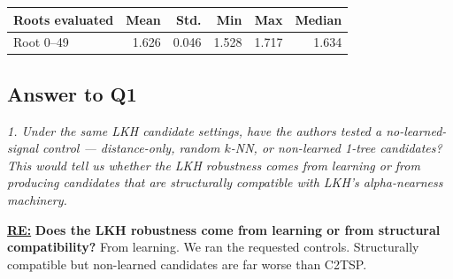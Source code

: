 \begin{table}[htbp]
    \centering
    \label{tab:root_gap_statistics}
    \begin{tabular}{lrrrrr}
        \hline
        Roots evaluated & Mean & Std. & Min  & Max  & Median \\
        \hline
        Root 0--49 & 1.626 & 0.046 & 1.528 & 1.717 & 1.634 \\
        \hline
    \end{tabular}
\end{table}




\subsection{Answer to Q1}

\textit{1. Under the same LKH candidate settings, have the authors tested a no-learned-signal control — distance-only, random $k$-NN, or non-learned 1-tree candidates? This would tell us whether the LKH robustness comes from learning or from producing candidates that are structurally compatible with LKH's alpha-nearness machinery.}

\textbf{\underline{RE:}}
\textbf{Does the LKH robustness come from learning or from structural compatibility?} From learning. We ran the requested controls. Structurally compatible but non-learned
candidates are far worse than C2TSP.


